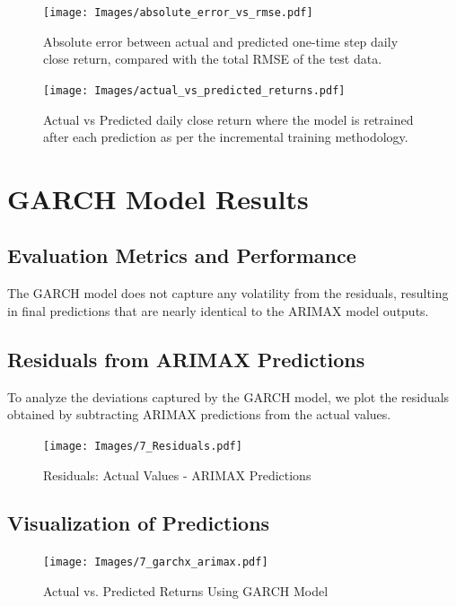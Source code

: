 \begin{figure}[h!]
    \centering
    \texttt{[image: Images/absolute\_error\_vs\_rmse.pdf]}
    \caption{Absolute error between actual and predicted one-time step daily close return, compared with the total RMSE of the test data.}
    \label{fig:absolute_error_rmse}
\end{figure}

\begin{figure}[h!]
    \centering
    \texttt{[image: Images/actual\_vs\_predicted\_returns.pdf]}
    \caption{Actual vs Predicted daily close return where the model is retrained after each prediction as per the incremental training methodology.}
    \label{fig:actual_vs_predicted}
\end{figure}

\newpage
\section{GARCH Model Results}

\subsection{Evaluation Metrics and Performance}

The GARCH model does not capture any volatility from the residuals, resulting in final predictions that are nearly identical to the ARIMAX model outputs.

\subsection{Residuals from ARIMAX Predictions}

To analyze the deviations captured by the GARCH model, we plot the residuals obtained by subtracting ARIMAX predictions from the actual values.

\begin{figure}[h!]
    \centering
    \texttt{[image: Images/7\_Residuals.pdf]}
    \caption{Residuals: Actual Values - ARIMAX Predictions}
    \label{fig:residuals_actual_arimax}
\end{figure}

\subsection{Visualization of Predictions}

\begin{figure}[h!]
    \centering
    \texttt{[image: Images/7\_garchx\_arimax.pdf]}
    \caption{Actual vs. Predicted Returns Using GARCH Model}
    \label{fig:garch_actual_pred}
\end{figure}

